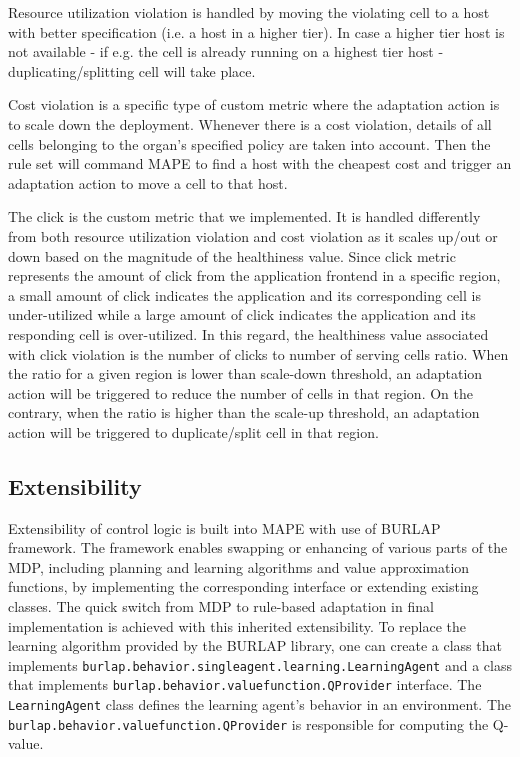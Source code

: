 \documentclass{seal_thesis}
\begin{document}
Resource utilization violation is handled by moving the violating cell to a host with better specification (i.e. a host in a higher tier).
In case a higher tier host is not available - if e.g. the cell is already running on a highest tier host - duplicating/splitting cell will take place.

Cost violation is a specific type of custom metric where the adaptation action is to scale down the deployment.
Whenever there is a cost violation, details of all cells belonging to the organ's specified policy are taken into account.
Then the rule set will command MAPE to find a host with the cheapest cost and trigger an adaptation action to move a cell to that host.

The click is the custom metric that we implemented.
It is handled differently from both resource utilization violation and cost violation as it scales up/out or down based on the magnitude of the healthiness value.
Since click metric represents the amount of click from the application frontend in a specific region, a small amount of click indicates the application and its corresponding cell is under-utilized while a large amount of click indicates the application and its responding cell is over-utilized.
In this regard, the healthiness value associated with click violation is the number of clicks to number of serving cells ratio.
When the ratio for a given region is lower than scale-down threshold, an adaptation action will be triggered to reduce the number of cells in that region.
On the contrary, when the ratio is higher than the scale-up threshold, an adaptation action will be triggered to duplicate/split cell in that region.

\subsection{Extensibility}\label{sec:mdpext}
\begin{sloppypar}
Extensibility of control logic is built into MAPE with use of BURLAP framework.
The framework enables swapping or enhancing of various parts of the MDP, including planning and learning algorithms and value approximation functions, by implementing the corresponding interface or extending existing classes.
The quick switch from MDP to rule-based adaptation in final implementation is achieved with this inherited extensibility.
To replace the learning algorithm provided by the BURLAP library, one can create a class that implements \texttt{burlap.behavior.singleagent.learning.LearningAgent} and a class that implements \texttt{burlap.behavior.valuefunction.QProvider} interface.
The \texttt{LearningAgent} class defines the learning agent's behavior in an environment.
The \texttt{burlap.behavior.valuefunction.QProvider} is responsible for computing the Q-value.
\end{sloppypar}
\end{document}
